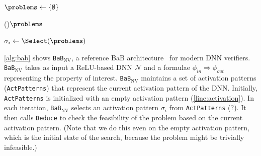 \documentclass[oneside,11pt,dvipsnames]{book}
\numberwithin{equation}{section}
\theoremstyle{definition}
\theoremstyle{remark}
\newcommand{\functiontextformat}[1]{\textrm{\texttt{#1}}}
\newcommand{\tvn}[1]{\iftoggle{usecomment}{{\color{red}{[TVN]: #1}}}{}}
\newcommand{\hd}[1]{\iftoggle{usecomment}{{\color{blue}{[HD]: #1}}}{}}
\newcommand{\bab}{\texttt{BaB$_{\text{NV}}$}}
\begin{document}
\begin{algorithm}
    \footnotesize
    \BlankLine

    $\problems \leftarrow \{ \emptyset \}$  
    
    \While(){$\problems$}{\label{line:dpllstart}
        $\sigma_i \gets \Select(\problems)$ 
        
    }\label{line:dpllend}
    \Return{\myunsat}
    
    \caption{The \bab{} algorithm.}\label{alg:bab}
\end{algorithm}


\autoref{alg:bab} shows \bab{}, a reference BaB architecture~\cite{nakagawa2014consolidating} for modern DNN verifiers. \bab{} takes as input a ReLU-based DNN $\mathcal{N}$ and a formulae $\phi_{in}\Rightarrow \phi_{out}$ representing the property of interest.
\bab{} maintains a set of activation patterns (\texttt{ActPatterns}) that represent the current activation pattern of the DNN. Initially, \texttt{ActPatterns} is initialized with an empty activation pattern (\autoref{line:activation}).
In each iteration, \bab{} selects an activation pattern $\sigma_i$ from \texttt{ActPatterns} (\tvn{also remove $\sigma_i$ from \texttt{ActPatterns}}?)\hd{yes}.  It then calls \functiontextformat{Deduce} to check the feasibility of the problem based on the current activation pattern. (Note that we do this even on the empty activation pattern, which is the initial state of the search, because the problem might be trivially infeasible.)
\end{document}
